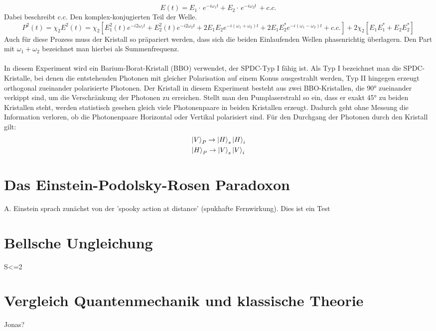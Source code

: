 \documentclass[twoside,colorback,accentcolor=tud4c,11pt]{tudreport}
\begin{document}
\begin{equation}
E\left(t\right)=E_{1}\cdot\,e^{-i\omega_{1}t}+E_{2}\cdot\,e^{-i\omega_{2}t}\,+c.c.
\end{equation}
Dabei beschreibt c.c. Den komplex-konjugierten Teil der Welle.
\begin{equation}
P^{2}(t)=\chi_{2}E^{2}(t)
=\chi_{2}\left[E_{1}^{2}(t)e^{-i2\omega_{1}t}+E_{2}^{2}(t)e^{-i2\omega_{2}t}+2E_{1}E_{2}e^{-i(\omega_{1}+\omega_{2})t}+2E_{1}E_{2}^{*}e^{-i(\omega_{1}-\omega_{2})t}+c.c.\right]+2\chi_{2}\left[E_{1}E_{1}^{*}+E_{2}E_{2}^{*}\right]
\end{equation}
Auch für diese Prozess muss der Kristall so präpariert werden, dass sich die beiden Einlaufenden Wellen phasenrichtig überlagern. Den Part mit $\omega_{1}+\omega_{2}$ bezeichnet man hierbei als Summenfrequenz.\\
\\In diesem Experiment wird ein Barium-Borat-Kristall (BBO) verwendet, der SPDC-Typ I fähig ist. Als Typ I bezeichnet man die SPDC-Kristalle, bei denen die entstehenden Photonen mit gleicher Polarisation auf einem Konus ausgestrahlt werden, Typ II hingegen erzeugt orthogonal zueinander polarisierte Photonen.
Der Kristall in diesem Experiment besteht aus zwei BBO-Kristallen, die 90° zueinander verkippt sind, um die Verschränkung der Photonen zu erreichen. Stellt man den Pumplaserstrahl so ein, dass er exakt 45° zu beiden Kristallen steht, werden statistisch gesehen gleich viele Photonenpaare in beiden Kristallen erzeugt. Dadurch geht ohne Messung die Information verloren, ob die Photonenpaare Horizontal oder Vertikal polarisiert sind.
Für den Durchgang der Photonen durch den Kristall gilt:
\begin{align*}
&\Ket{V}_{P}\rightarrow\Ket{H}_{s}\Ket{H}_{i}\\
&\Ket{H}_{P}\rightarrow\Ket{V}_{s}\Ket{V}_{i}
\end{align*}
\section{Das Einstein-Podolsky-Rosen Paradoxon}
A. Einstein sprach zunächst von der 'spooky action at distance' (spukhafte Fernwirkung). 
Dies ist ein Test
\section{Bellsche Ungleichung}
S<=2
\section{Vergleich Quantenmechanik und klassische Theorie}
Jonas?
\end{document}
